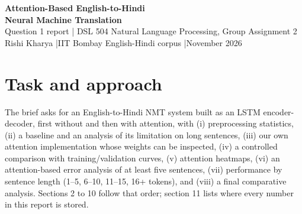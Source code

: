 \documentclass[10pt,a4paper]{article}
\begin{document}
\begin{center}
{\LARGE\bfseries\color{accent} Attention-Based English-to-Hindi\\[2pt] Neural Machine Translation}\\[6pt]
{\large Question 1 report | DSL 504 Natural Language Processing, Group Assignment 2}\\[3pt]
Rishi Kharya \quad|\quad IIT Bombay English-Hindi corpus \quad|\quad November 2026
\end{center}
\vspace{2pt}

\begin{center}\end{center}

\tableofcontents

\section{Task and approach}
The brief asks for an English-to-Hindi NMT system built as an LSTM encoder-decoder, first without and then with attention, with
(i) preprocessing statistics, (ii) a baseline and an analysis of its limitation on long sentences, (iii) our own attention
implementation whose weights can be inspected, (iv) a controlled comparison with training/validation curves, (v) attention
heatmaps, (vi) an attention-based error analysis of at least five sentences, (vii) performance by sentence length
(1--5, 6--10, 11--15, 16+ tokens), and (viii) a final comparative analysis. Sections 2 to 10 follow that order; section 11 lists
where every number in this report is stored.
\end{document}
